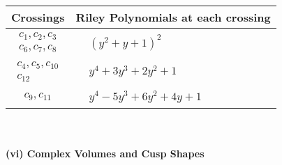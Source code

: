 \documentclass[1p]{elsarticle_modified}
\theoremstyle{definition}
\begin{document}
\begin{tabular}{m{50pt}|m{274pt}}
Crossings & \hspace{64pt}Riley Polynomials at each crossing \\
\hline $$\begin{aligned}c_{1},c_{2},c_{3}\\c_{6},c_{7},c_{8}\end{aligned}$$&$\begin{aligned}
&(y^2+y+1)^2
\end{aligned}$\\
\hline $$\begin{aligned}c_{4},c_{5},c_{10}\\c_{12}\end{aligned}$$&$\begin{aligned}
&y^4+3 y^3+2 y^2+1
\end{aligned}$\\
\hline $$\begin{aligned}c_{9},c_{11}\end{aligned}$$&$\begin{aligned}
&y^4-5 y^3+6 y^2+4 y+1
\end{aligned}$\\
\hline
\end{tabular}\\~\\
\newpage\flushleft \textbf{(vi) Complex Volumes and Cusp Shapes}
\end{document}
